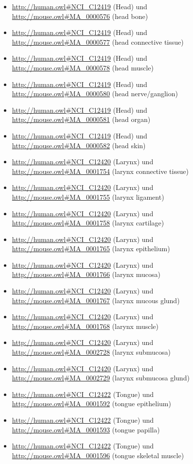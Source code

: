 \begin{itemize}
	\item \url{http://human.owl#NCI_C12419} (Head) und \url{http://mouse.owl#MA_0000576} (head bone)
	\item \url{http://human.owl#NCI_C12419} (Head) und \url{http://mouse.owl#MA_0000577} (head connective tissue)
	\item \url{http://human.owl#NCI_C12419} (Head) und \url{http://mouse.owl#MA_0000578} (head muscle)
	\item \url{http://human.owl#NCI_C12419} (Head) und \url{http://mouse.owl#MA_0000580} (head nerve/ganglion)
	\item \url{http://human.owl#NCI_C12419} (Head) und \url{http://mouse.owl#MA_0000581} (head organ)
	\item \url{http://human.owl#NCI_C12419} (Head) und \url{http://mouse.owl#MA_0000582} (head skin)
	\item \url{http://human.owl#NCI_C12420} (Larynx) und \url{http://mouse.owl#MA_0001754} (larynx connective tissue)
	\item \url{http://human.owl#NCI_C12420} (Larynx) und \url{http://mouse.owl#MA_0001755} (larynx ligament)
	\item \url{http://human.owl#NCI_C12420} (Larynx) und \url{http://mouse.owl#MA_0001758} (larynx cartilage)
	\item \url{http://human.owl#NCI_C12420} (Larynx) und \url{http://mouse.owl#MA_0001765} (larynx epithelium)
	\item \url{http://human.owl#NCI_C12420} (Larynx) und \url{http://mouse.owl#MA_0001766} (larynx mucosa)
	\item \url{http://human.owl#NCI_C12420} (Larynx) und \url{http://mouse.owl#MA_0001767} (larynx mucous glund)
	\item \url{http://human.owl#NCI_C12420} (Larynx) und \url{http://mouse.owl#MA_0001768} (larynx muscle)
	\item \url{http://human.owl#NCI_C12420} (Larynx) und \url{http://mouse.owl#MA_0002728} (larynx submucosa)
	\item \url{http://human.owl#NCI_C12420} (Larynx) und \url{http://mouse.owl#MA_0002729} (larynx submucosa glund)
	\item \url{http://human.owl#NCI_C12422} (Tongue) und \url{http://mouse.owl#MA_0001592} (tongue epithelium)
	\item \url{http://human.owl#NCI_C12422} (Tongue) und \url{http://mouse.owl#MA_0001593} (tongue papilla)
	\item \url{http://human.owl#NCI_C12422} (Tongue) und \url{http://mouse.owl#MA_0001596} (tongue skeletal muscle)

\end{itemize}
